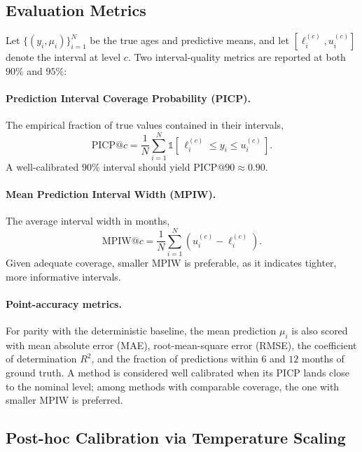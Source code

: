 \subsection{Evaluation Metrics}
\label{sec:metrics}

Let $\{(y_i, \mu_i)\}_{i=1}^{N}$ be the true ages and predictive means, and let
$[\ell_i^{(c)}, u_i^{(c)}]$ denote the interval at level $c$. Two
interval-quality metrics are reported at both $90\%$ and $95\%$:

\paragraph{Prediction Interval Coverage Probability (PICP).} The empirical
fraction of true values contained in their intervals,
\begin{equation}
  \mathrm{PICP}@c = \frac{1}{N}\sum_{i=1}^{N}
  \mathbb{1}\!\left[\,\ell_i^{(c)} \le y_i \le u_i^{(c)}\,\right].
\end{equation}
A well-calibrated $90\%$ interval should yield $\mathrm{PICP}@90 \approx 0.90$.

\paragraph{Mean Prediction Interval Width (MPIW).} The average interval width in
months,
\begin{equation}
  \mathrm{MPIW}@c = \frac{1}{N}\sum_{i=1}^{N}
  \left(u_i^{(c)} - \ell_i^{(c)}\right).
\end{equation}
Given adequate coverage, smaller MPIW is preferable, as it indicates tighter,
more informative intervals.

\paragraph{Point-accuracy metrics.} For parity with the deterministic baseline,
the mean prediction $\mu_i$ is also scored with mean absolute error (MAE),
root-mean-square error (RMSE), the coefficient of determination $R^2$, and the
fraction of predictions within $6$ and $12$ months of ground truth. A method is
considered well calibrated when its PICP lands close to the nominal level; among
methods with comparable coverage, the one with smaller MPIW is preferred.

\subsection{Post-hoc Calibration via Temperature Scaling}
\label{sec:calibration}

